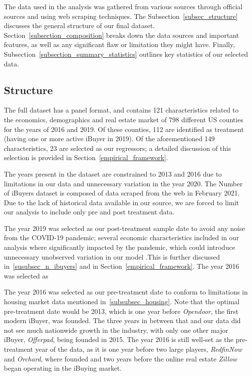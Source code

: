 The data used in the analysis was gathered from various sources through official sources and using web scraping techniques. The Subsection~\ref{subsec_structure} discusses the general structure of our final dataset. Section~\ref{subsection_composition} breaks down the data sources and important features, as well as any significant flaw or limitation they might have. Finally, Subsection~\ref{subsection_summary_statistics} outlines key statistics of our selected data. 

\subsection{Structure}\label{subsection_structure}
The full dataset has a panel format, and contains 121 characteristics related to the economics, demographics and real estate market of 798 different US counties for the years of 2016 and 2019. Of these counties, 112 are identified as treatment (having one or more active iBuyer in 2019). Of the aforementioned 149 characteristics, 23 are selected as our regressors; a detailed discussion of this selection is provided in Section~\ref{empirical_framework}.

The years present in the dataset are constrained to 2013 and 2016 due to limitations in our data and unnecessary variation in the year 2020. The Number of iBuyers dataset is composed of data scraped from the web in February 2021. Due to the lack of historical data available in our source, we are forced to limit our analysis to include only pre and post treatment data. 

The year 2019 was selected as our post-treatment sample date to avoid any noise from the COVID-19 pandemic; several economic characteristics included in our analysis where significantly impacted by the pandemic, which could introduce unnecessary unobserved variation in our model .This is further discussed in~\ref{susubsec_n_ibuyers} and in Section~\ref{empirical_framework}. The year 2016 was selected as 

The year 2016 was selected as our pre-treatment date to conform to limitations in housing market data mentioned in~\ref{subsubsec_housing}. Note that the optimal pre-treatment date would be 2013, which is one year before \textit{Opendoor}, the first modern iBuyer, was founded. The three years in between that and our data did not see much nationwide growth in the industry, with only one other major iBuyer, \textit{Offerpad}, being founded in 2015. The year 2016 is still well-set as the pre-treatment year of the data, as it is one year before two large players, \textit{RedfinNow} and \textit{Orchard}, where founded and two years before the online real estate \textit{Zillow} began operating in the iBuying market.

